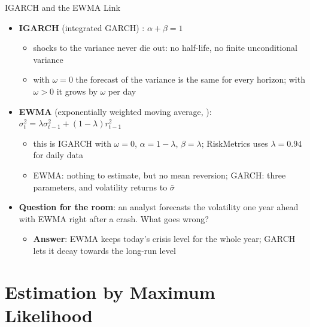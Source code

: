 \begin{frame}{IGARCH and the EWMA Link}
\itemsize{\small}
\begin{itemize}
    \item \textbf{IGARCH} (integrated GARCH) : $\alpha + \beta = 1$
    \begin{itemize}
        \item shocks to the variance never die out: no half-life, no finite unconditional variance
        \item with $\omega = 0$ the forecast of the variance is the same for every horizon; with $\omega > 0$ it grows by $\omega$ per day
    \end{itemize}
    \item \textbf{EWMA} (exponentially weighted moving average, ): $\sigma_t^2 = \lambda\sigma_{t-1}^2 + (1 - \lambda)r_{t-1}^2$
    \begin{itemize}
        \item this is IGARCH with $\omega = 0$, $\alpha = 1 - \lambda$, $\beta = \lambda$; RiskMetrics uses $\lambda = 0.94$ for daily data
        \item EWMA: nothing to estimate, but no mean reversion; GARCH: three parameters, and volatility returns to $\bar\sigma$
    \end{itemize}
    \item \textbf{Question for the room}: an analyst forecasts the volatility one year ahead with EWMA right after a crash. What goes wrong?
    \begin{itemize}
        \item \textbf{Answer}: EWMA keeps today's crisis level for the whole year; GARCH lets it decay towards the long-run level
    \end{itemize}
\end{itemize}
\end{frame}


\section{Estimation by Maximum Likelihood}

